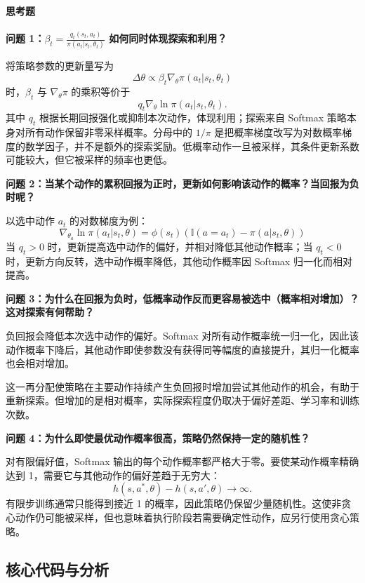 \documentclass[11pt,a4paper,UTF8]{ctexart}
\numberwithin{figure}{section}
\numberwithin{table}{section}
\newcommand{\answerlabel}{%
  \par\smallskip\noindent{\heiti\bfseries 回答：}\quad}
\newcommand{\question}[1]{\par\smallskip\noindent\textbf{#1}\par}
\begin{document}
\paragraph{思考题}


\question{问题 1：$\beta_t = \frac{q_t(s_t,a_t)}{\pi(a_t|s_t,\theta_t)}$ 如何同时体现探索和利用？}

\answerlabel 将策略参数的更新量写为
$$\Delta \theta \propto \beta_t \nabla_\theta \pi(a_t|s_t, \theta_t)$$
时，$\beta_t$ 与 $\nabla_\theta\pi$ 的乘积等价于
\[
q_t\nabla_\theta\ln\pi(a_t|s_t,\theta_t).
\]
其中 $q_t$ 根据长期回报强化或抑制本次动作，体现利用；探索来自 Softmax 策略本身对所有动作保留非零采样概率。分母中的 $1/\pi$ 是把概率梯度改写为对数概率梯度的数学因子，并不是额外的探索奖励。低概率动作一旦被采样，其条件更新系数可能较大，但它被采样的频率也更低。

\question{问题 2：当某个动作的累积回报为正时，更新如何影响该动作的概率？当回报为负时呢？}

\answerlabel 以选中动作 $a_t$ 的对数梯度为例：
$$\nabla_{\theta_a} \ln \pi(a_t|s_t, \theta) = \phi(s_t) (\mathbb{I}(a = a_t) - \pi(a|s_t, \theta))$$
当 $q_t>0$ 时，更新提高选中动作的偏好，并相对降低其他动作概率；当 $q_t<0$ 时，更新方向反转，选中动作概率降低，其他动作概率因 Softmax 归一化而相对提高。

\question{问题 3：为什么在回报为负时，低概率动作反而更容易被选中（概率相对增加）？这对探索有何帮助？}

\answerlabel 负回报会降低本次选中动作的偏好。Softmax 对所有动作概率统一归一化，因此该动作概率下降后，其他动作即使参数没有获得同等幅度的直接提升，其归一化概率也会相对增加。

这一再分配使策略在主要动作持续产生负回报时增加尝试其他动作的机会，有助于重新探索。但增加的是相对概率，实际探索程度仍取决于偏好差距、学习率和训练次数。

\question{问题 4：为什么即使最优动作概率很高，策略仍然保持一定的随机性？}

\answerlabel 对有限偏好值，Softmax 输出的每个动作概率都严格大于零。要使某动作概率精确达到 1，需要它与其他动作的偏好差趋于无穷大：
\[
h(s,a^*,\theta)-h(s,a',\theta)\to\infty.
\]
有限步训练通常只能得到接近 1 的概率，因此策略仍保留少量随机性。这使非贪心动作仍可能被采样，但也意味着执行阶段若需要确定性动作，应另行使用贪心策略。

\subsection{核心代码与分析}
\end{document}
